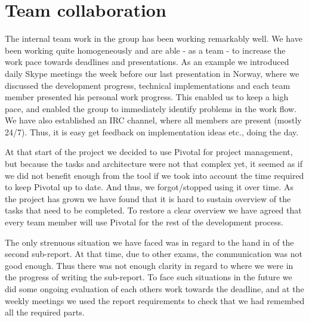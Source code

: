 \section{Team collaboration}
The internal team work in the group has been working remarkably well. We have been
working quite homogeneously and are able - as a team - to increase the work pace towards
deadlines and presentations. As an example we introduced daily Skype meetings
the week before our last presentation in Norway, where we discussed the
development progress, technical implementations and each team member presented his
personal work progress. This enabled us to keep a high pace, and enabled the
group to immediately identify problems in the work flow. We have also established
an IRC channel, where all members are present (mostly 24/7). Thus, it is easy
get feedback on implementation ideas etc., doing the day.

At that start of the project we decided to use Pivotal for project management,
but because the tasks and architecture were not that complex yet, it seemed
as if we did not benefit enough from the tool if we took into account the time
required to keep Pivotal up to date. And thus, we forgot/stopped using it over time.
As the project has grown we have found that it is hard to sustain overview of
the tasks that need to be completed. To restore a clear overview we have
agreed that every team member will use Pivotal for the rest of the development
process.

The only strenuous situation we have faced was in regard to the hand in of the
second sub-report. At that time, due to other exams, the communication was not
good enough. Thus there was not enough clarity in regard to where we were
in the progress of writing the sub-report. To face such situations in the future
we did some ongoing evaluation of each others work towards the
deadline, and at the weekly meetings we used the report requirements to
check that we had remembed all the required parts.
